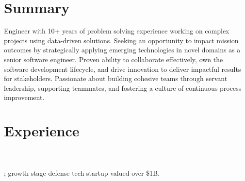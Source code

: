 %
%
\sectionsep
\section{Summary}

\raggedright

Engineer with 10+ years of problem solving experience working on complex projects using data-driven solutions. Seeking an opportunity to impact mission outcomes by strategically applying emerging technologies in novel domains as a senior software engineer.
Proven ability to collaborate effectively, own the software development lifecycle, and drive innovation to deliver impactful results for stakeholders.
Passionate about building cohesive teams through servant leadership, supporting teammates, and fostering a culture of continuous process improvement.

\sectionsep

\section{Experience}
\\
\\
; growth-stage defense tech startup valued over \$1B.

